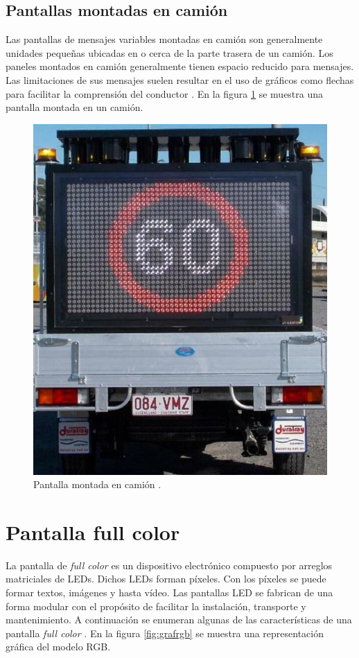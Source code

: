 \pagebreak
\subsection{Pantallas montadas en camión}

Las pantallas de mensajes variables montadas en camión son generalmente unidades pequeñas ubicadas en o cerca de la parte trasera de un camión. Los paneles montados en camión generalmente tienen espacio reducido para mensajes. Las limitaciones de sus mensajes suelen resultar en el uso de gráficos como flechas para facilitar la comprensión del conductor \citep{VMSTYPES}. En la figura \ref{fig:vmsc} se muestra una pantalla montada en un camión.

\begin{figure}[htpb]
	\centering
	\includegraphics[scale=1]{../Figures/vmstruck.png} 
	\caption{Pantalla montada en camión \protect\footnotemark.}
	\label{fig:vmsc}
\end{figure}


\section{Pantalla full color}
La pantalla de \textit{full color} es un dispositivo electrónico compuesto por arreglos matriciales de LEDs. Dichos LEDs forman píxeles. Con los píxeles se puede formar textos, imágenes y hasta vídeo. Las pantallas LED se fabrican de una forma modular con el propósito de facilitar la instalación, transporte y mantenimiento. A continuación se enumeran algunas de las características de una pantalla \textit{full color} \citep{WIKIPANTALLAFULLCOLOR}. En la figura \ref{fig:grafrgb} se muestra una representación gráfica del modelo RGB.


